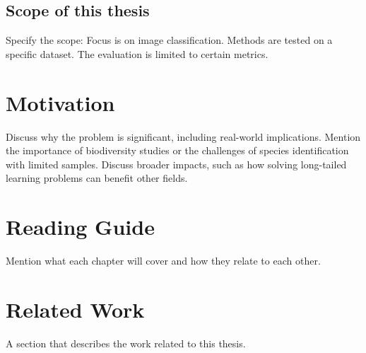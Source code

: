 \subsection{Scope of this thesis}
Specify the scope:
Focus is on image classification.
Methods are tested on a specific dataset.
The evaluation is limited to certain metrics.

\section{Motivation}
Discuss why the problem is significant, including real-world implications.
Mention the importance of biodiversity studies or the challenges of species identification with limited samples.
Discuss broader impacts, such as how solving long-tailed learning problems can benefit other fields.


\section{Reading Guide}
Mention what each chapter will cover and how they relate to each other.

\section{Related Work}
A section that describes the work related to this thesis. 
